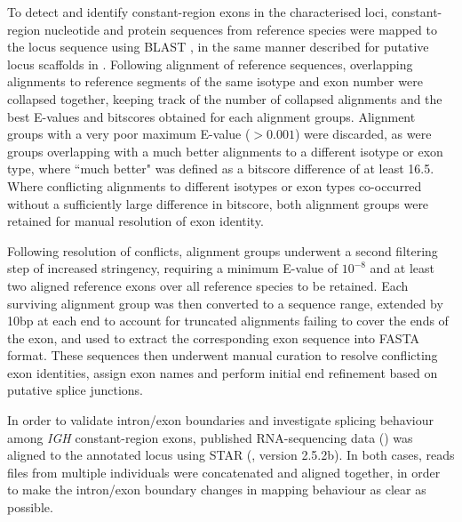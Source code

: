 To detect and identify constant-region exons in the characterised loci, constant-region nucleotide and protein sequences from reference species were mapped to the locus sequence using BLAST \parencite{altschul1990blast,altschul1997blast}, in the same manner described for putative locus scaffolds in .
Following alignment of reference sequences, overlapping alignments to reference segments of the same isotype and exon number were collapsed together, keeping track of the number of collapsed alignments and the best E-values and bitscores obtained for each alignment groups. Alignment groups with a very poor maximum E-value ($> 0.001$) were discarded, as were groups overlapping with a much better alignments to a different isotype or exon type, where ``much better" was defined as a bitscore difference of at least 16.5. Where conflicting alignments to different isotypes or exon types co-occurred without a sufficiently large difference in bitscore, both alignment groups were retained for manual resolution of exon identity.

Following resolution of conflicts, alignment groups underwent a second filtering step of increased stringency, requiring a minimum E-value of $10^{-8}$ and at least two aligned reference exons over all reference species to be retained. Each surviving alignment group was then converted to a sequence range, extended by 10bp at each end to account for truncated alignments failing to cover the ends of the exon, and used to extract the corresponding exon sequence into FASTA format. These sequences then underwent manual curation to resolve conflicting exon identities, assign exon names and perform initial end refinement based on putative splice junctions.

In order to validate intron/exon boundaries and investigate splicing behaviour among \textit{IGH} constant-region exons, published RNA-sequencing data () was aligned to the annotated locus using STAR (\parencite{dobin2013star}, version 2.5.2b). In both cases, reads files from multiple individuals were concatenated and aligned together, in order to make the intron/exon boundary changes in mapping behaviour as clear as possible. %

